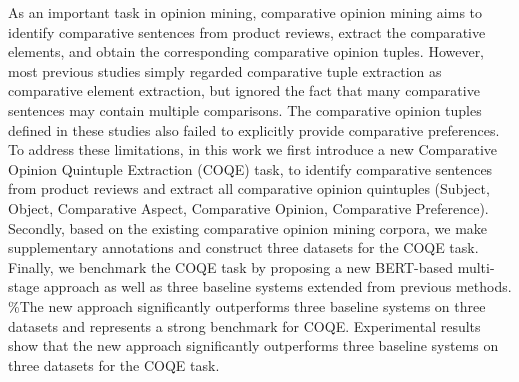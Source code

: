 As an important task in opinion mining, comparative opinion mining aims to identify comparative sentences from product reviews, extract the comparative elements, and obtain the corresponding comparative opinion tuples. However, most previous studies simply regarded comparative tuple extraction as comparative element extraction, but ignored the fact that many comparative sentences may contain multiple comparisons. The comparative opinion tuples defined in these studies also failed to explicitly provide comparative preferences. To address these limitations, in this work we first introduce a new Comparative Opinion Quintuple Extraction (COQE) task, to identify comparative sentences from product reviews and extract all comparative opinion quintuples (Subject, Object, Comparative Aspect, Comparative Opinion, Comparative Preference). Secondly, based on the existing comparative opinion mining corpora, we make supplementary annotations and construct three datasets for the COQE task. Finally, we benchmark the COQE task by proposing a new BERT-based multi-stage approach as well as three baseline systems extended from previous methods. \%The new approach significantly outperforms three baseline systems on three datasets and represents a strong benchmark for COQE. Experimental results show that the new approach significantly outperforms three baseline systems on three datasets for the COQE task.
